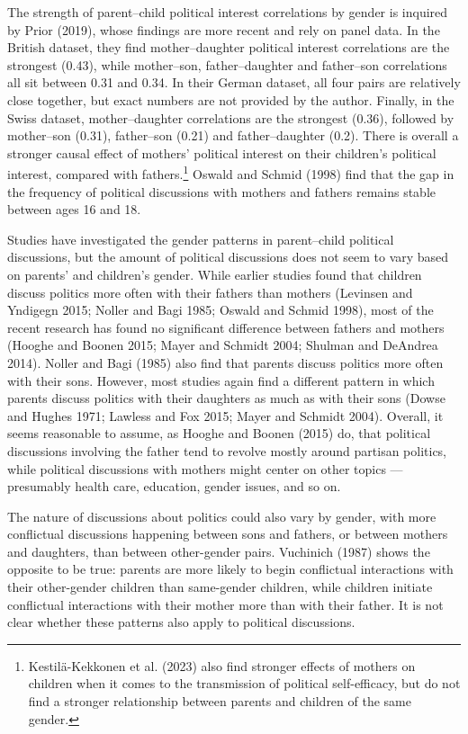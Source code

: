 \documentclass[
  letterpaper,
  DIV=11,
  numbers=noendperiod]{scrreprt}
\begin{document}
The strength of parent--child political interest correlations by gender
is inquired by Prior (2019), whose findings are more recent and rely on
panel data. In the British dataset, they find mother--daughter political
interest correlations are the strongest (0.43), while mother--son,
father--daughter and father--son correlations all sit between 0.31 and
0.34. In their German dataset, all four pairs are relatively close
together, but exact numbers are not provided by the author. Finally, in
the Swiss dataset, mother--daughter correlations are the strongest
(0.36), followed by mother--son (0.31), father--son (0.21) and
father--daughter (0.2). There is overall a stronger causal effect of
mothers' political interest on their children's political interest,
compared with fathers.\footnote{Kestilä-Kekkonen et al. (2023) also find
  stronger effects of mothers on children when it comes to the
  transmission of political self-efficacy, but do not find a stronger
  relationship between parents and children of the same gender.} Oswald
and Schmid (1998) find that the gap in the frequency of political
discussions with mothers and fathers remains stable between ages 16 and
18.

Studies have investigated the gender patterns in parent--child political
discussions, but the amount of political discussions does not seem to
vary based on parents' and children's gender. While earlier studies
found that children discuss politics more often with their fathers than
mothers (Levinsen and Yndigegn 2015; Noller and Bagi 1985; Oswald and
Schmid 1998), most of the recent research has found no significant
difference between fathers and mothers (Hooghe and Boonen 2015; Mayer
and Schmidt 2004; Shulman and DeAndrea 2014). Noller and Bagi (1985)
also find that parents discuss politics more often with their sons.
However, most studies again find a different pattern in which parents
discuss politics with their daughters as much as with their sons (Dowse
and Hughes 1971; Lawless and Fox 2015; Mayer and Schmidt 2004). Overall,
it seems reasonable to assume, as Hooghe and Boonen (2015) do, that
political discussions involving the father tend to revolve mostly around
partisan politics, while political discussions with mothers might center
on other topics --- presumably health care, education, gender issues,
and so on.

The nature of discussions about politics could also vary by gender, with
more conflictual discussions happening between sons and fathers, or
between mothers and daughters, than between other-gender pairs.
Vuchinich (1987) shows the opposite to be true: parents are more likely
to begin conflictual interactions with their other-gender children than
same-gender children, while children initiate conflictual interactions
with their mother more than with their father. It is not clear whether
these patterns also apply to political discussions.
\end{document}
